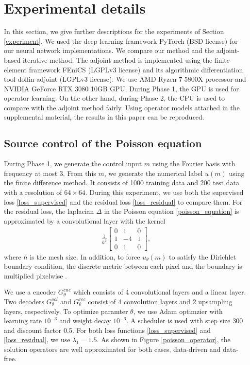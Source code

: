 \documentclass[letterpaper]{article}
\begin{document}
\section{Experimental details}\label{appendix_experiment}
In this section, we give further descriptions for the experiments of Section \ref{experiment}. 
We used the deep learning framework PyTorch \cite{paszke2019pytorch} (BSD license) for our neural network implementations. We compare our method and the adjoint-based iterative method. The adjoint method is implemented using the finite element framework FEniCS \cite{alnaes2015fenics} (LGPLv3 license) and its algorithmic differentiation tool dolfin-adjoint \cite{mitusch2019dolfin} (LGPLv3 license). We use AMD Ryzen 7 5800X processor and NVIDIA GeForce RTX 3080 10GB GPU. During Phase 1, the GPU is used for operator learning. On the other hand, during Phase 2, the CPU is used to compare with the adjoint method fairly. Using operator models attached in the supplemental material, the results in this paper can be reproduced. 
\subsection{Source control of the Poisson equation}\label{appendix_poisson}





During Phase 1, we generate the control input $m$ using the Fourier basis with frequency at most 3.
From this $m$, we generate the numerical label $u(m)$ using the finite difference method. It consists of 1000 training data and 200 test data with a resolution of $64\times64$. During this experiment, we use both the supervised loss \eqref{loss_supervised} and the residual loss \eqref{loss_residual} to compare them. For the residual loss, the laplacian $\Delta$ in the Poisson equation \eqref{poisson_equation} is approximated by a convolutional layer with the kernel
\begin{align*}
  \frac{1}{h^2}
  \begin{bmatrix}
    0 & 1 & 0\\
    1 & -4 & 1\\
    0 & 1 & 0
  \end{bmatrix},
\end{align*}
where $h$ is the mesh size. In addition, to force $u_\theta(m)$ to satisfy the Dirichlet boundary condition, the discrete metric between each pixel and the boundary is multiplied pixelwise \cite{berg2018unified}.

We use a encoder $G_\theta^{enc}$ which consists of 4 convolutional layers and a linear layer. Two decoders $G_\theta^{sol}$ and $G_\theta^{rec}$ consist of 4 convolution layers and 2 upsampling layers, respectively. To optimize paramter $\theta$, we use Adam optimzier with learning rate $10^{-3}$ and weight decay $10^{-6}$. A scheduler is used with step size 300 and discount factor 0.5. For both loss functions \eqref{loss_supervised} and \eqref{loss_residual}, we use $\lambda_1 = 1.5$. As shown in Figure \ref{poisson_operator}, the solution operators are well approximated for both cases, data-driven and data-free.
\end{document}
